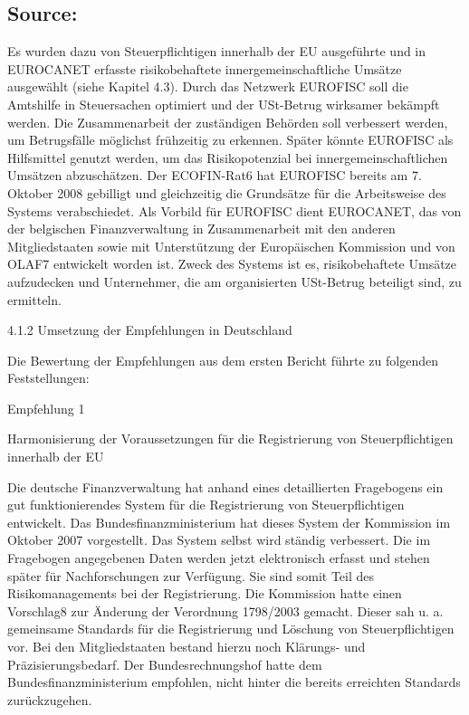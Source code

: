 \documentclass[10pt]{article}
\begin{document}
\subsection*{Source:}

Es wurden dazu von Steuerpflichtigen innerhalb der EU ausgeführte und in EUROCANET erfasste risikobehaftete innergemeinschaftliche Umsätze ausgewählt (siehe Kapitel 4.3).
Durch das Netzwerk EUROFISC soll die Amtshilfe in Steuersachen optimiert und der USt-Betrug wirksamer bekämpft werden. Die Zusammenarbeit der zuständigen Behörden soll verbessert werden, um Betrugsfälle möglichst frühzeitig zu erkennen.
Später könnte EUROFISC als Hilfsmittel genutzt werden, um das Risikopotenzial bei innergemeinschaftlichen Umsätzen abzuschätzen.
Der ECOFIN-Rat6 hat EUROFISC bereits am 7. Oktober 2008 gebilligt und gleichzeitig die Grundsätze für die Arbeitsweise des Systems verabschiedet.
Als Vorbild für EUROFISC dient EUROCANET, das von der belgischen Finanzverwaltung in Zusammenarbeit mit den anderen Mitgliedstaaten sowie mit Unterstützung der Europäischen Kommission und von OLAF7 entwickelt worden ist.
Zweck des Systems ist es, risikobehaftete Umsätze aufzudecken und Unternehmer, die am organisierten USt-Betrug beteiligt sind, zu ermitteln.


4.1.2 Umsetzung der Empfehlungen in Deutschland



Die Bewertung der Empfehlungen aus dem ersten Bericht führte zu folgenden Feststellungen:



Empfehlung 1



Harmonisierung der Voraussetzungen für die Registrierung von Steuerpflichtigen innerhalb der EU

Die deutsche Finanzverwaltung hat anhand eines detaillierten Fragebogens ein gut funktionierendes System für die Registrierung von Steuerpflichtigen entwickelt.
Das Bundesfinanzministerium hat dieses System der Kommission im Oktober 2007 vorgestellt.
Das System selbst wird ständig verbessert.
Die im Fragebogen angegebenen Daten werden jetzt elektronisch erfasst und stehen später für Nachforschungen zur Verfügung. Sie sind somit Teil des Risikomanagements bei der Registrierung.
Die Kommission hatte einen Vorschlag8 zur Änderung der Verordnung 1798/2003 gemacht. Dieser sah u. a. gemeinsame Standards für die Registrierung und Löschung von Steuerpflichtigen vor.
Bei den Mitgliedstaaten bestand hierzu noch Klärungs- und Präzisierungsbedarf.
Der Bundesrechnungshof hatte dem Bundesfinanzministerium empfohlen, nicht hinter die bereits erreichten Standards zurückzugehen.
\end{document}
